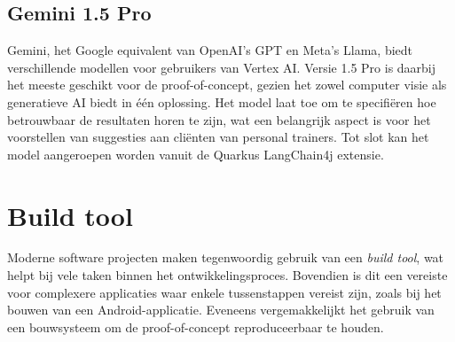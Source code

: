 \subsection{Gemini 1.5 Pro}
\label{subsec:gemini-1.5-pro}
Gemini, het Google equivalent van OpenAI's GPT en Meta's Llama, biedt verschillende modellen voor gebruikers van Vertex AI\@.
Versie 1.5 Pro is daarbij het meeste geschikt voor de proof-of-concept, gezien het zowel computer visie als generatieve AI biedt in één oplossing.
Het model laat toe om te specifiëren hoe betrouwbaar de resultaten horen te zijn, wat een belangrijk aspect is voor het voorstellen van suggesties aan cliënten van personal trainers.
Tot slot kan het model aangeroepen worden vanuit de Quarkus LangChain4j extensie.

\section{Build tool}
\label{sec:build-tool}
Moderne software projecten maken tegenwoordig gebruik van een \textit{build tool}, wat helpt bij vele taken binnen het ontwikkelingsproces.
Bovendien is dit een vereiste voor complexere applicaties waar enkele tussenstappen vereist zijn, zoals bij het bouwen van een Android-applicatie.
Eveneens vergemakkelijkt het gebruik van een bouwsysteem om de proof-of-concept reproduceerbaar te houden.

